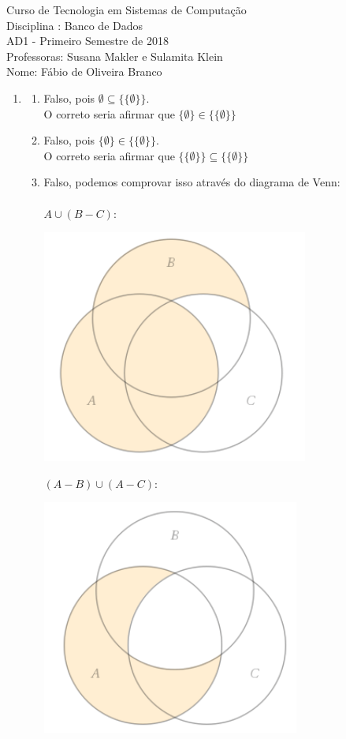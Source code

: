 \documentclass[a4paper, 12pt]{article}
\begin{document}
 \begin{center}
  Curso de Tecnologia em Sistemas de Computação \\
  Disciplina : Banco de Dados \\
  AD1 - Primeiro Semestre de 2018 \\
  Professoras: Susana Makler e Sulamita Klein \\
  Nome: Fábio de Oliveira Branco\\ 
 \end{center}
 \begin{enumerate}
  \item \begin{enumerate}
  \item Falso, pois $\emptyset \subseteq \{\{\emptyset\}\}$. \\
  O correto seria afirmar que $\{\emptyset \} \in \{\{\emptyset\}\}$\\
  
  \item Falso, pois $\{\emptyset \} \in \{\{\emptyset\}\}$. \\
  O correto seria afirmar que $\{\{\emptyset\}\} \subseteq  \{\{\emptyset\}\}$
  \item Falso, podemos comprovar isso através do diagrama de Venn:\\ \\
  $A \cup (B - C)$:
  \begin{center}
    \includegraphics{img/primeiro.png}
  \end{center}
  $ (A - B) \cup (A - C)$:
  \begin{center}
    \includegraphics{img/segundo.png}
  \end{center}
  \end{enumerate}
  \newpage
 \end{enumerate}
\end{document}
